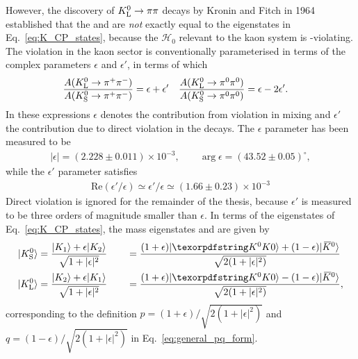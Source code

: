 However, the discovery of ${{K}^0_{\mathrm{L}}}\rightarrow\pi\pi$ decays by Kronin and Fitch in 1964 established that the \KS and \KL are \emph{not} exactly equal to the \CP eigenstates in Eq.~\eqref{eq:K_CP_states}, because the $\mathcal H_0$ relevant to the kaon system is \CP-violating. The \CP violation in the kaon sector is conventionally parameterised in terms of the complex parameters $\epsilon$ and $\epsilon'$, in terms of which
\begin{align}
    \frac{A({{K}^0_{\mathrm{L}}}\rightarrow{\ensuremath{{\pi}^+}}{\ensuremath{{\pi}^-}})}{A({{K}^0_{\mathrm{S}}}\rightarrow{\ensuremath{{\pi}^+}}{\ensuremath{{\pi}^-}})} &= \epsilon + \epsilon' &
    \frac{A({{K}^0_{\mathrm{L}}}\rightarrow{\ensuremath{{\pi}^0}}{\ensuremath{{\pi}^0}})}{A({{K}^0_{\mathrm{S}}}\rightarrow{\ensuremath{{\pi}^0}}{\ensuremath{{\pi}^0}})} &= \epsilon -2 \epsilon'. 
\end{align}
In these expressions $\epsilon$ denotes the contribution from \CP violation in mixing and $\epsilon'$ the contribution due to direct \CP violation in the decays.  The $\epsilon$ parameter has been measured to be~\cite{PDG2020}  
\begin{align}\label{eq:PDG_epsilon}
    |\epsilon|=(2.228\pm 0.011)\times 10^{-3}, \qquad \arg \epsilon = (43.52\pm 0.05)^\circ,
\end{align}
while the $\epsilon'$ parameter satisfies~\cite{PDG2020}
\begin{align}
  \text{Re}(\epsilon'/\epsilon)\simeq \epsilon'/\epsilon \simeq (1.66\pm0.23)\times 10^{-3}
\end{align}
Direct \CP violation is ignored for the remainder of the thesis, because $\epsilon'$ is measured to be three orders of magnitude smaller than $\epsilon$. In terms of the \CP eigenstates of Eq.~\eqref{eq:K_CP_states}, the mass eigenstates \KS and \KL are given by
\begin{align}
\begin{split}
    \ket{\KS}   &= \frac{\ket{K_1} + \epsilon \ket{K_2}}{\sqrt{ 1+|\epsilon|^2}} 
     \qquad= \frac{(1+\epsilon)\ket\Kz + (1-\epsilon)\ket\Kzb}{\sqrt{2(1+|\epsilon|^2)}} 
    \\
    \ket{\KL}   &= \frac{\ket{K_2} + \epsilon \ket{K_1}}{\sqrt{ 1+|\epsilon|^2}} 
     \qquad= \frac{(1+\epsilon)\ket\Kz - (1-\epsilon)\ket\Kzb}{\sqrt{2(1+|\epsilon|^2)}},
\end{split}
\end{align}
corresponding to the definition $p=(1+\epsilon)/\sqrt{2(1+|\epsilon|^2)}$ and $q=(1-\epsilon)/\sqrt{2(1+|\epsilon|^2)}$ in Eq.~\eqref{eq:general_pq_form}.




